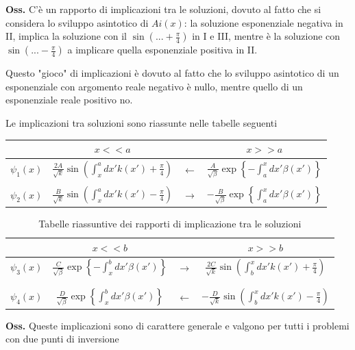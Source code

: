 \textbf{Oss.} C'è un rapporto di implicazioni tra le soluzioni, dovuto al fatto che si
considera lo sviluppo asintotico di $Ai(x)$: la soluzione esponenziale negativa in II, implica
la soluzione con il $\sin\left(...+\frac{\pi}{4}\right)$ in I e III, mentre è la soluzione con
$\sin\left(...-\frac{\pi}{4}\right)$ a implicare quella esponenziale positiva in II.

Questo "gioco" di implicazioni è dovuto al fatto che lo sviluppo asintotico di un esponenziale con
argomento reale negativo è nullo, mentre quello di un esponenziale reale positivo no.

Le implicazioni tra soluzioni sono riassunte nelle tabelle seguenti

\begin{table}[H]
\centering
\begin{tabular}{|c|ccc|}
    \hline
    & $x<<a$ & &$x>>a$\\ \hline
    $\psi_1(x)$&$\displaystyle\frac{2A}{\sqrt{k}}\sin\left(\int_{x}^{a}dx'k(x')+\frac{\pi}{4}\right)$&
    $\leftarrow$ & $\displaystyle\frac{A}{\sqrt{\beta}}\exp\left\{-\int_{a}^{x}dx'\beta(x')\right\}$ \\
    &&& \\

    $\psi_2(x)$&$\displaystyle\frac{B}{\sqrt{k}}\sin\left(\int_{x}^{a}dx'k(x')-\frac{\pi}{4}\right)$&
    $\rightarrow$ & $\displaystyle-\frac{B}{\sqrt{\beta}}\exp\left\{\int_{a}^{x}dx'\beta(x')\right\}$ \\ \hline
\end{tabular}
\end{table}
\begin{table}[H]
\centering
\begin{tabular}{|c|ccc|}
    \hline
    & $x<<b$ & &$x>>b$\\ \hline
    $\psi_3(x)$&$\displaystyle\frac{C}{\sqrt{\beta}}\exp\left\{-\int_{x}^{b}dx'\beta(x')\right\}$&
    $\rightarrow$ & $\displaystyle\frac{2C}{\sqrt{k}}\sin\left(\int_{b}^{x}dx'k(x')+\frac{\pi}{4}\right)$\\ \phantom{x}&&& \\
    &&& \\

    $\psi_4(x)$&$\displaystyle\frac{D}{\sqrt{\beta}}\exp\left\{\int_{x}^{b}dx'\beta(x')\right\}$&
    $\leftarrow$ &$\displaystyle-\frac{D}{\sqrt{k}}\sin\left(\int_{b}^{x}dx'k(x')-\frac{\pi}{4}\right)$ \\ \hline
\end{tabular}
\caption{\small Tabelle riassuntive dei rapporti di implicazione tra le soluzioni}
\label{tab:wkb}
\end{table}
\textbf{Oss.} Queste implicazioni sono di carattere generale e valgono per tutti i problemi
con due punti di inversione
